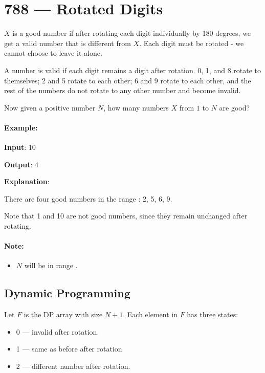 \section{788 --- Rotated Digits}
$X$ is a good number if after rotating each digit individually by 180 degrees, we get a valid number that is different from $X$.  Each digit must be rotated - we cannot choose to leave it alone.

A number is valid if each digit remains a digit after rotation. 0, 1, and 8 rotate to themselves; 2 and 5 rotate to each other; 6 and 9 rotate to each other, and the rest of the numbers do not rotate to any other number and become invalid.

Now given a positive number $N$, how many numbers $X$ from $1$ to $N$ are good?

\paragraph{Example:}

\begin{flushleft}
\textbf{Input}: 10

\textbf{Output}: 4

\textbf{Explanation}: 

There are four good numbers in the range \fcj{[1, 10]} : 2, 5, 6, 9.

Note that 1 and 10 are not good numbers, since they remain unchanged after rotating.
\end{flushleft}

\paragraph{Note:}

\begin{itemize}
\item $N$  will be in range \fcj{[1, 10000]}.
\end{itemize}

\subsection{Dynamic Programming}
Let $F$ is the DP array with size $N+1$. Each element in $F$ has three states:

\begin{itemize}
\item 0 --- invalid after rotation.
\item 1 --- same as before after rotation
\item 2 --- different number after rotation.
\end{itemize}


